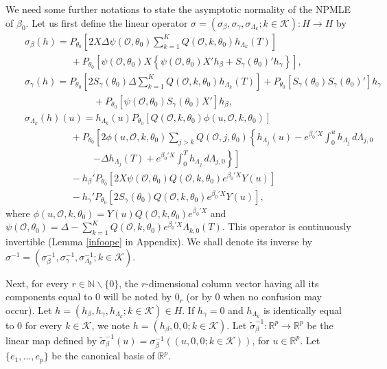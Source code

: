 \documentclass{statsoc}
\begin{document}
We need some further notations to state the asymptotic normality of the NPMLE of $\beta_0$. Let us first define the linear operator $\sigma=(\sigma_\beta,\sigma_\gamma,\sigma_{\Lambda_k};k\in\mathcal K):H\rightarrow H$ by
\begin{eqnarray*}
&&\sigma_\beta(h)=P_{\theta_0}\left[2X\Delta \psi(\mathcal O,\theta_0)\sum_{k=1}^KQ(\mathcal O,k,\theta_0) h_{\Lambda_k}(T) \right]\\
&&\hspace{2cm}+P_{\theta_0}\left[\psi(\mathcal O,\theta_0)X\left\{\psi(\mathcal O,\theta_0)X' h_\beta+S_\gamma(\theta_0)'h_\gamma\right\}\right],\\
&&\sigma_\gamma(h)=P_{\theta_0}\left[2S_\gamma(\theta_0)\Delta\sum_{k=1}^KQ(\mathcal O,k,\theta_0) h_{\Lambda_k}(T) \right]+P_{\theta_0}\left[S_\gamma(\theta_0)S_\gamma(\theta_0)'\right]h_\gamma\\
&&\hspace{3cm}+P_{\theta_0}\left[\psi(\mathcal O,\theta_0)S_\gamma(\theta_0)X'\right]h_\beta,\\
&&\sigma_{\Lambda_k}(h)(u)=h_{\Lambda_k}(u)P_{\theta_0}\left[Q(\mathcal O,k,\theta_0) \phi(u,\mathcal O, k, \theta_0) \right] \\
&&\hspace{2cm}+P_{\theta_0}\left[2\phi(u,\mathcal O,k,\theta_0)\sum_{j>k}Q(\mathcal O,j,\theta_0) \left\{h_{\Lambda_j}(u)-e^{\beta_0'X}\int_0^u h_{\Lambda_j}\,d\Lambda_{j,0}\right.\right.\\
&&\hspace{3cm}\left.\left.-\Delta h_{\Lambda_j}(T)+e^{\beta_0'X}\int_0^T h_{\Lambda_j}\,d\Lambda_{j,0}\right\}\right]\\
&&\hspace{2cm}-h_\beta'P_{\theta_0}\left[2X\psi(\mathcal O,\theta_0)Q(\mathcal O,k,\theta_0)e^{\beta_0'X}Y(u)\right]\\
&&\hspace{2cm}-h_\gamma'P_{\theta_0}\left[2S_\gamma(\theta_0)Q(\mathcal O,k,\theta_0)e^{\beta_0'X}Y(u)\right],
\end{eqnarray*}
where $\phi(u,\mathcal O,k,\theta_0)=Y(u)Q(\mathcal O,k,\theta_0)e^{\beta_0'X}$ and $\psi(\mathcal O,\theta_0)=\Delta -\sum_{k=1}^K Q(\mathcal O,k,\theta_0)e^{\beta_0'X}\Lambda_{k,0}(T)$. This operator is continuously invertible (Lemma \ref{infoope} in Appendix). We shall denote its inverse by $\sigma^{-1}=(\sigma_\beta^{-1},\sigma_\gamma^{-1},\sigma_{\Lambda_k}^{-1};k\in\mathcal K)$.

Next, for every $r\in\mathbb N\backslash \{0\}$, the $r$-dimensional column vector having all its components equal to 0 will be noted by $0_r$ (or by $0$ when no confusion may occur). Let $h=(h_\beta, h_\gamma, h_{\Lambda_k}; k\in\mathcal K)\in H$. If $h_\gamma=0$ and $h_{\Lambda_k}$ is identically equal to 0 for every $k\in\mathcal K$, we note $h=(h_\beta, 0, 0; k\in\mathcal K)$. Let $\widetilde \sigma_\beta^{-1}:{\ensuremath{\mathbb{R}}}^p\rightarrow {\ensuremath{\mathbb{R}}}^p$ be the linear map defined by $\widetilde \sigma_\beta^{-1}(u)=\sigma_\beta^{-1}((u,0,0;k\in\mathcal K))$, for $u\in{\ensuremath{\mathbb{R}}}^p$. Let $\{e_1,\ldots,e_p\}$ be the canonical basis of ${\ensuremath{\mathbb{R}}}^p$.
\end{document}
